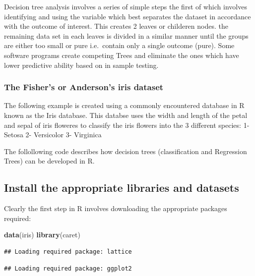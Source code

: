 \documentclass[
]{article}
\newenvironment{Shaded}{\begin{snugshade}}{\end{snugshade}}
\newcommand{\KeywordTok}[1]{\textcolor[rgb]{0.13,0.29,0.53}{\textbf{#1}}}
\newcommand{\NormalTok}[1]{#1}
\begin{document}
Decision tree analysis involves a series of simple steps the first of
which involves identifying and using the variable which best separates
the dataset in accordance with the outcome of interest. This creates 2
leaves or childeren nodes. the remaining data set in each leaves is
divided in a similar manner until the groups are either too small or
pure i.e.~contain only a single outcome (pure). Some software programs
create competing Trees and eliminate the ones which have lower
predictive ability based on in sample testing.

\hypertarget{the-fishers-or-andersons-iris-dataset}{%
\subsubsection{The Fisher's or Anderson's iris
dataset}\label{the-fishers-or-andersons-iris-dataset}}

The following example is created using a commonly encountered database
in R known as the Iris database. This databse uses the width and length
of the petal and sepal of iris floweres to classify the iris flowers
into the 3 different species: 1- Setosa 2- Versicolor 3- Virginica

The follollowing code describes how decision trees (classification and
Regression Trees) can be developed in R.

\hypertarget{install-the-appropriate-libraries-and-datasets}{%
\subsection{Install the appropriate libraries and
datasets}\label{install-the-appropriate-libraries-and-datasets}}

Clearly the first step in R involves downloading the appropriate
packages required:

\begin{Shaded}
\begin{Highlighting}[]
\KeywordTok{data}\NormalTok{(iris)}
\KeywordTok{library}\NormalTok{(caret)}
\end{Highlighting}
\end{Shaded}

\begin{verbatim}
## Loading required package: lattice
\end{verbatim}

\begin{verbatim}
## Loading required package: ggplot2
\end{verbatim}
\end{document}
